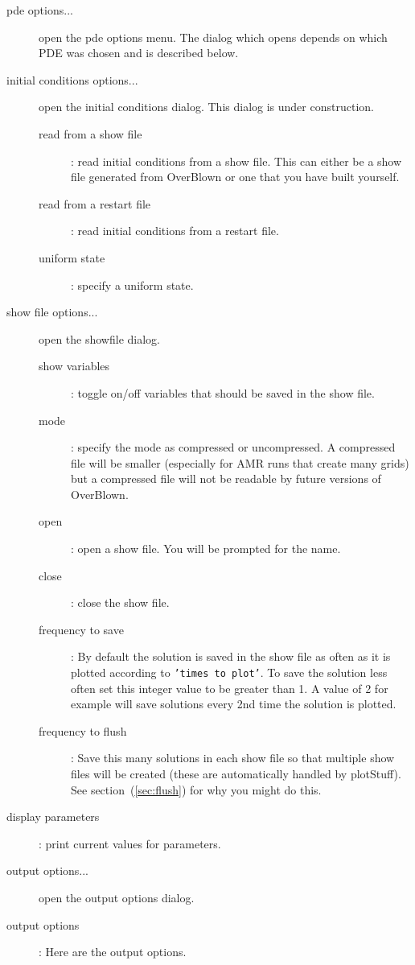 \begin{description}
 \item[pde options...] open the pde options menu. The dialog which opens depends on which PDE was chosen and is described below.
 \item[initial conditions options...] open the initial conditions dialog. This dialog is under
      construction.
    \begin{description}
      \item[read from a show file]: read initial conditions from a show file. This can either be
        a show file generated from OverBlown or one that you have built yourself.
      \item[read from a restart file]: read initial conditions from a restart file.  
      \item[uniform state] : specify a uniform state.
     \end{description}
 \item[show file options...] open the showfile dialog.
    \begin{description}
        \item[show variables] : toggle on/off variables that should be saved in the show file.
        \item[mode] : specify the mode as compressed or uncompressed. A compressed file will be
         smaller (especially for AMR runs that create many grids) but a compressed file will not
         be readable by future versions of OverBlown. 
        \item[open] : open a show file. You will be prompted for the name.
        \item[close] : close the show file.
      \item[frequency to save] : By default the solution is saved in the show file
          as often as it is plotted according to {\tt 'times to plot'}. To save the solution less
          often set this integer value to be greater than 1. A value of 2 for example will save solutions
          every 2nd time the solution is plotted.
      \item[frequency to flush] : Save this many solutions in each show file so that multiple
        show files will be created (these are automatically handled by plotStuff). See section~(\ref{sec:flush})
        for why you might do this.  
     \end{description}
 \item[display parameters] : print current values for parameters.
 \item[output options...] open the output options dialog.
  \item[output options] : Here are the output options.

\end{description}
